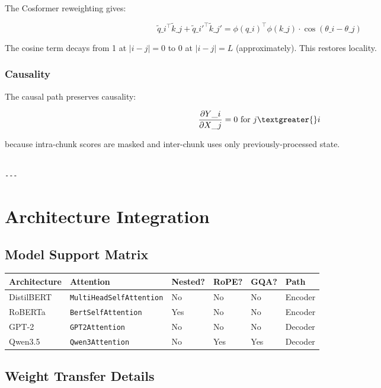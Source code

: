 The Cosformer reweighting gives:

\[
\tilde{q}\_i^\top \tilde{k}\_j + \tilde{q}\_i'^\top \tilde{k}\_j' = \phi(q\_i)^\top \phi(k\_j) \cdot \cos(\theta\_i - \theta\_j)
\]

The cosine term decays from 1 at $|i - j| = 0$ to 0 at $|i - j| = L$ 
(approximately). This restores locality.

\subsubsection{Causality}

The causal path preserves causality:

\[
\frac{\partial Y\_i}{\partial X\_j} = 0 \text{ for } j \textgreater{} i
\]

because intra-chunk scores are masked and inter-chunk uses only 
previously-processed state.
\begin{lstlisting}

---
\end{lstlisting}


\section{Architecture Integration}

\subsection{Model Support Matrix}

\begin{table}[H]
\centering
\small
\begin{tabular}{llllll}
\toprule
\textbf{Architecture} & \textbf{Attention} & \textbf{Nested?} & \textbf{RoPE?} & \textbf{GQA?} & \textbf{Path} \\
\midrule
DistilBERT & \texttt{MultiHeadSelfAttention} & No & No & No & Encoder \\
RoBERTa & \texttt{BertSelfAttention} & Yes & No & No & Encoder \\
GPT-2 & \texttt{GPT2Attention} & No & No & No & Decoder \\
Qwen3.5 & \texttt{Qwen3Attention} & No & Yes & Yes & Decoder \\
\bottomrule
\end{tabular}
\end{table}

\subsection{Weight Transfer Details}

